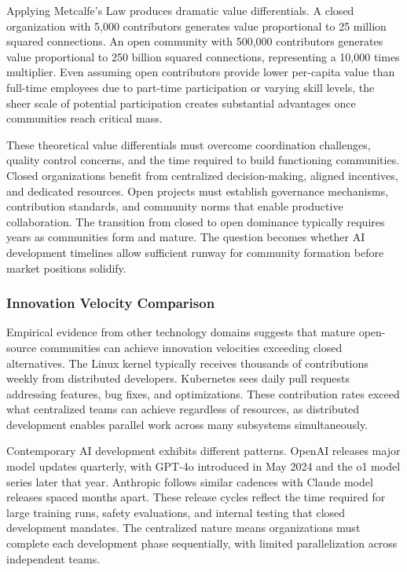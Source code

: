 Applying Metcalfe's Law produces dramatic value differentials. A closed organization with 5,000 contributors generates value proportional to 25 million squared connections. An open community with 500,000 contributors generates value proportional to 250 billion squared connections, representing a 10,000 times multiplier. Even assuming open contributors provide lower per-capita value than full-time employees due to part-time participation or varying skill levels, the sheer scale of potential participation creates substantial advantages once communities reach critical mass.

These theoretical value differentials must overcome coordination challenges, quality control concerns, and the time required to build functioning communities. Closed organizations benefit from centralized decision-making, aligned incentives, and dedicated resources. Open projects must establish governance mechanisms, contribution standards, and community norms that enable productive collaboration. The transition from closed to open dominance typically requires years as communities form and mature. The question becomes whether AI development timelines allow sufficient runway for community formation before market positions solidify.

\subsubsection{Innovation Velocity Comparison}

Empirical evidence from other technology domains suggests that mature open-source communities can achieve innovation velocities exceeding closed alternatives. The Linux kernel typically receives thousands of contributions weekly from distributed developers. Kubernetes sees daily pull requests addressing features, bug fixes, and optimizations. These contribution rates exceed what centralized teams can achieve regardless of resources, as distributed development enables parallel work across many subsystems simultaneously.

Contemporary AI development exhibits different patterns. OpenAI releases major model updates quarterly, with GPT-4o introduced in May 2024 and the o1 model series later that year. Anthropic follows similar cadences with Claude model releases spaced months apart. These release cycles reflect the time required for large training runs, safety evaluations, and internal testing that closed development mandates. The centralized nature means organizations must complete each development phase sequentially, with limited parallelization across independent teams.

